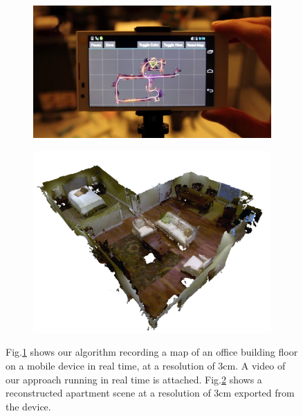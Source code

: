\documentclass[10pt,twocolumn,letterpaper]{article}
\newcommand{\figref}[1]{Fig.\ref{#1}}
\begin{document}
\maketitle
\begin{figure}
  \centering
    	 \begin{subfigure}{0.5\linewidth} \centering
		 \includegraphics[width=1\textwidth]{img/mapdevice}
		 \caption{}
		 \label{fig:map_device}
	 \end{subfigure}
      	 \begin{subfigure}{0.35\linewidth} \centering
		 \includegraphics[width=1\textwidth]{img/apartment_scene_color.png}
		 \caption{}
		 \label{fig:apartment_color}
	 \end{subfigure}
      \caption{\figref{fig:map_device} shows our algorithm recording a map
      of an office building floor on a mobile device in real time, at a resolution of 3cm. A video of our approach running
  in real time is attached. \figref{fig:apartment_color} shows a
  reconstructed apartment scene at a resolution of 3cm exported from the
  device.}
  \label{fig:first_figure}
\end{figure}
\end{document}
